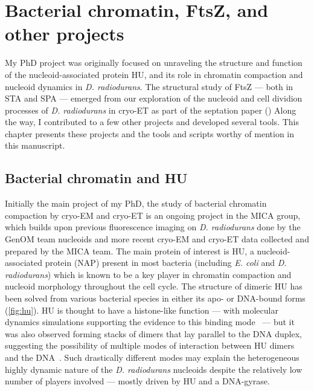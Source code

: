 \chapter{Bacterial chromatin, FtsZ, and other projects}\label{other_projects}

My PhD project was originally focused on unraveling the structure and function of the nucleoid-associated protein HU, and its role in chromatin compaction and nucleoid dynamics in \textit{D. radiodurans}.
The structural study of FtsZ --- both in STA and SPA --- emerged from our exploration of the nucleoid and cell dividion processes of \textit{D. radiodurans} in cryo-ET as part of the septation paper ()
Along the way, I contributed to a few other projects and developed several tools.
This chapter presents these projects and the tools and scripts worthy of mention in this manuscript.

\localtableofcontents

\section{Bacterial chromatin and HU}\label{hu}

Initially the main project of my PhD, the study of bacterial chromatin compaction by cryo-EM and cryo-ET is an ongoing project in the MICA group, which builds upon previous fluorescence imaging on \textit{D. radiodurans} done by the GenOM team nucleoids and more recent cryo-EM and cryo-ET data collected and prepared by the MICA team.
The main protein of interest is HU, a nucleoid-associated protein (NAP) present in most bacteria (including \textit{E. coli} and \textit{D. radiodurans}) which is known to be a key player in chromatin compaction and nucleoid morphology throughout the cell cycle.
The structure of dimeric HU has been solved from various bacterial species in either its apo- or DNA-bound forms (\autoref{fig:hu}).
HU is thought to have a histone-like function --- with molecular dynamics simulations supporting the evidence to this binding mode~\cite{hognonMolecularBasesDNA2019} --- but it was also observed forming stacks of dimers that lay parallel to the DNA duplex, suggesting the possibility of multiple modes of interaction between HU dimers and the DNA~\cite{hammelHUMultimerizationShift2016}.
Such drastically different modes may explain the heterogeneous highly dynamic nature of the \textit{D. radiodurans} nucleoids despite the relatively low number of players involved --- mostly driven by HU and a DNA-gyrase.

